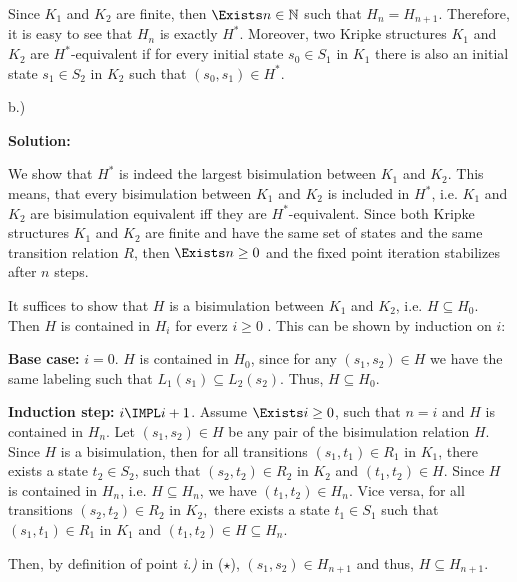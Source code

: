 Since $K_{1}$ and $K_{2}$ are finite, then $\Exists n\in \mathbb{N}$ such
that $H_{n}=H_{n+1}$. Therefore, it is easy to see that $H_{n}$ is exactly $%
H^{\ast }$. Moreover, two Kripke structures $K_{1}$ and $K_{2}$ are $H^{\ast
}$-equivalent if for every initial state $s_{0}\in S_{1}$ in $K_{1}$ there
is also an initial state $s_{1}\in S_{2}$ in $K_{2}$ such that $%
(s_{0},s_{1})\in H^{\ast }$.

\bigskip 

b.)

\textbf{Solution:}

\medskip

We show that $H^{\ast }$ is indeed the largest bisimulation between $K_{1}$
and $K_{2}$. This means, that every bisimulation between $K_{1}$ and $K_{2}$
is included in $H^{\ast }$, i.e. $K_{1}$ and $K_{2}$ are bisimulation
equivalent iff they are $H^{\ast }$-equivalent. Since both Kripke structures 
$K_{1}$ and $K_{2}$ are finite and have the same set of states and the same
transition relation $R$, then $\Exists n\geq 0$ and the fixed point
iteration stabilizes after $n$ steps.

\bigskip 

It suffices to show that $H$ is a bisimulation between $K_{1}$ and $K_{2}$,
i.e. $H\subseteq H_{0}$. Then $H$ is contained in $H_{i}$ for everz $i\geq 0$%
. This can be shown by induction on $i$:

\bigskip 

\textbf{Base case:} $i=0$. $H$ is contained in $H_{0}$, since for any $%
(s_{1},s_{2})\in H$ we have the same labeling such that $L_{1}(s_{1})%
\subseteq L_{2}(s_{2}).$ Thus, $H\subseteq H_{0}$.

\bigskip 

\textbf{Induction step:} $i\IMPL i+1$. Assume $\Exists i\geq 0$, such that $%
n=i$ and $H$ is contained in $H_{n}$. Let $(s_{1},s_{2})\in H$ be any pair
of the bisimulation relation $H$. Since $H$ is a bisimulation, then for all
transitions $(s_{1},t_{1})\in R_{1}$ in $K_{1}$, there exists a state $%
t_{2}\in S_{2}$, such that $(s_{2},t_{2})\in R_{2}$ in $K_{2}$ and $%
(t_{1},t_{2})\in H$. Since $H$ is contained in $H_{n}$, i.e. $H\subseteq
H_{n}$, we have $(t_{1},t_{2})\in H_{n}$. Vice versa, for all transitions $%
(s_{2},t_{2})\in R_{2}$ in $K_{2}$,\ there exists a state $t_{1}\in S_{1}$
such that $(s_{1},t_{1})\in R_{1}$ in $K_{1}$ and $(t_{1},t_{2})\in
H\subseteq H_{n}$.

Then, by definition of point \textit{i.)} in ($\star$), $%
(s_{1},s_{2})\in H_{n+1}$ and thus, $H\subseteq H_{n+1}$.

